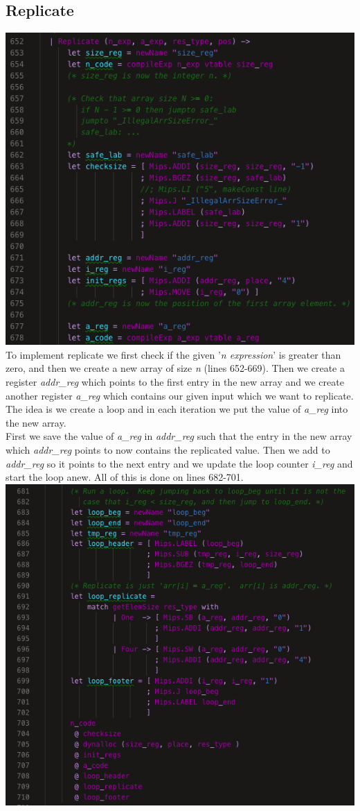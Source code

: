 \subsection{Replicate}
\includegraphics[width=\linewidth]{Materials/CodeGen/ReplicateIntro}
To implement replicate we first check if the given '\textit{n expression}' is greater than zero, and then we create a new array of size \textit{n} (lines 652-669). Then we create a register \textit{addr\_reg} which points to the first entry in the new array and we create another register \textit{a\_reg} which contains our given input which we want to replicate.\\
The idea is we create a loop and in each iteration we put the value of \textit{a\_reg} into the new array.\\
First we save the value of \textit{a\_reg} in \textit{addr\_reg} such that the entry in the new array which \textit{addr\_reg} points to now contains the replicated value. Then we add to \textit{addr\_reg} so it points to the next entry and we update the loop counter \textit{i\_reg} and start the loop anew. All of this is done on lines 682-701.\\
\includegraphics[width=\linewidth]{Materials/CodeGen/Replicate1}
